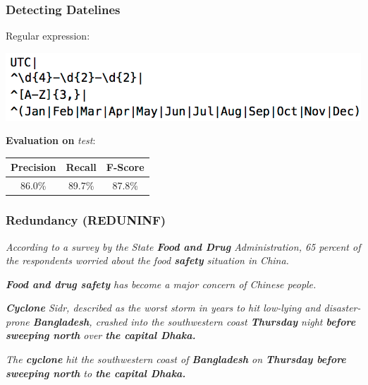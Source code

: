 \documentclass[table]{beamer}
\begin{document}
\begin{frame}
  \frametitle{Detecting Datelines}
  Regular expression:

  \includegraphics[scale=0.4]{regex.png}

  \vspace{1cm}\pause

  \textbf{Evaluation on} \textit{test}:

  \vspace{0.5cm}

  \begin{tabular}{|c|c|c|}
  \hline
  \textbf{Precision} & \textbf{Recall} & \textbf{F-Score}\\
  \hline
  86.0\% & 89.7\% & 87.8\%\\
  \hline
  \end{tabular}
\end{frame}

\begin{frame}
  \frametitle{Redundancy (REDUNINF)}
  \textit{According to a survey by the State \textbf{Food and Drug} Administration, 65 percent of the respondents worried about the food \textbf{safety} situation in China.}
  \vspace{0.1cm}

  \textit{\textbf{Food and drug safety} has become a major concern of Chinese people.}
  \vspace{0.25cm}
  \hline
  \vspace{0.25cm}

  \textit{\textbf{Cyclone} Sidr, described as the worst storm in years to hit low-lying and disaster-prone \textbf{Bangladesh}, crashed into the southwestern coast \textbf{Thursday} night \textbf{before sweeping north} over \textbf{the capital Dhaka.}}
  \vspace{0.1cm}

  \textit{The \textbf{cyclone} hit the southwestern coast of \textbf{Bangladesh} on \textbf{Thursday before sweeping north} to \textbf{the capital Dhaka.}}
\end{frame}
\end{document}
